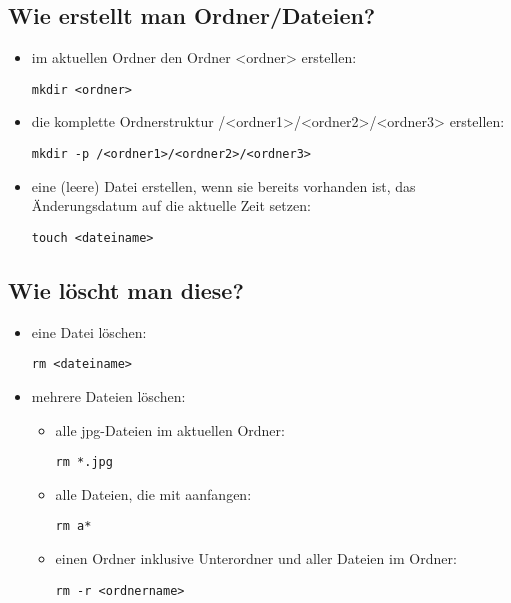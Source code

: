 \documentclass[a4paper,12pt]{article}
\begin{document}
\subsection{Wie erstellt man Ordner/Dateien?}
\begin{itemize}
\item im aktuellen Ordner den Ordner <ordner> erstellen: 
\begin{lstlisting}
mkdir <ordner>
\end{lstlisting} 
\item die komplette Ordnerstruktur /<ordner1>/<ordner2>/<ordner3> erstellen: 
\begin{lstlisting}
mkdir -p /<ordner1>/<ordner2>/<ordner3>
\end{lstlisting} 
\item eine (leere) Datei erstellen, wenn sie bereits vorhanden ist, 
das Änderungsdatum auf die aktuelle Zeit setzen: 
\begin{lstlisting}
touch <dateiname>
\end{lstlisting} 
\end{itemize}

\subsection{Wie löscht man diese?}
\begin{itemize}
\item eine Datei löschen: 
\begin{lstlisting}
rm <dateiname>
\end{lstlisting} 
\item mehrere Dateien löschen:
\begin{itemize}
\item alle jpg-Dateien im aktuellen Ordner: 
\begin{lstlisting}
rm *.jpg
\end{lstlisting} 
\item alle Dateien, die mit \glqq a\grqq anfangen: 
\begin{lstlisting}
rm a*
\end{lstlisting} 
\item einen Ordner inklusive Unterordner und aller Dateien im Ordner: 
\begin{lstlisting}
rm -r <ordnername>
\end{lstlisting} 
\end{itemize}
\end{itemize}
\end{document}
